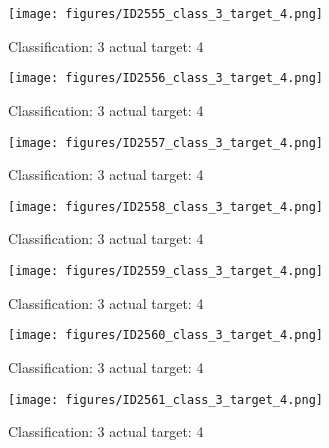 \begin{figure}[h!]
\begin{center}
\texttt{[image: figures/ID2555\_class\_3\_target\_4.png]}
\end{center}
\caption{ Classification: 3 actual target: 4}
\label{fig:ID2555_class_3_target_4}
\end{figure}
\begin{figure}[h!]
\begin{center}
\texttt{[image: figures/ID2556\_class\_3\_target\_4.png]}
\end{center}
\caption{ Classification: 3 actual target: 4}
\label{fig:ID2556_class_3_target_4}
\end{figure}
\begin{figure}[h!]
\begin{center}
\texttt{[image: figures/ID2557\_class\_3\_target\_4.png]}
\end{center}
\caption{ Classification: 3 actual target: 4}
\label{fig:ID2557_class_3_target_4}
\end{figure}
\begin{figure}[h!]
\begin{center}
\texttt{[image: figures/ID2558\_class\_3\_target\_4.png]}
\end{center}
\caption{ Classification: 3 actual target: 4}
\label{fig:ID2558_class_3_target_4}
\end{figure}
\begin{figure}[h!]
\begin{center}
\texttt{[image: figures/ID2559\_class\_3\_target\_4.png]}
\end{center}
\caption{ Classification: 3 actual target: 4}
\label{fig:ID2559_class_3_target_4}
\end{figure}
\begin{figure}[h!]
\begin{center}
\texttt{[image: figures/ID2560\_class\_3\_target\_4.png]}
\end{center}
\caption{ Classification: 3 actual target: 4}
\label{fig:ID2560_class_3_target_4}
\end{figure}
\begin{figure}[h!]
\begin{center}
\texttt{[image: figures/ID2561\_class\_3\_target\_4.png]}
\end{center}
\caption{ Classification: 3 actual target: 4}
\label{fig:ID2561_class_3_target_4}
\end{figure}
